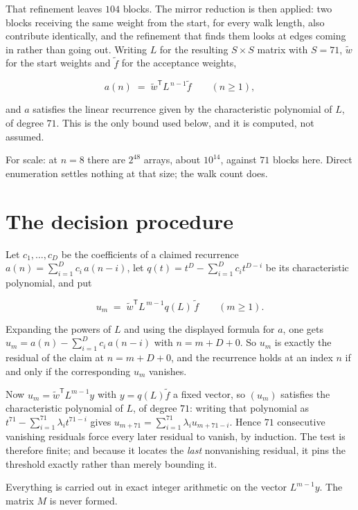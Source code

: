 \documentclass[11pt]{article}
\theoremstyle{definition}
\begin{document}
That refinement leaves $104$ blocks. The mirror reduction is then applied: two blocks receiving the same weight from the start, for every walk length, also contribute identically, and the refinement that finds them looks at edges coming in rather than going out. Writing $L$ for the resulting $S \times S$ matrix with $S = 71$, $\tilde w$ for the start weights and $\tilde f$ for the acceptance weights,

\[a(n) \;=\; \tilde w^{\mathsf T} L^{\,n-1} \tilde f \qquad (n \ge 1),\]

and $a$ satisfies the linear recurrence given by the characteristic polynomial of $L$, of degree $71$. This is the only bound used below, and it is computed, not assumed.

For scale: at $n = 8$ there are $2^{48}$ arrays, about $10^{14}$, against $71$ blocks here. Direct enumeration settles nothing at that size; the walk count does.

\section{The decision procedure}

Let $c_1,\dots,c_D$ be the coefficients of a claimed recurrence $a(n) = \sum_{i=1}^{D} c_i\,a(n-i)$, let $q(t) = t^{D} - \sum_{i=1}^{D} c_i t^{D-i}$ be its characteristic polynomial, and put

\[u_m \;=\; \tilde w^{\mathsf T} L^{\,m-1} q(L)\,\tilde f \qquad (m \ge 1).\]

Expanding the powers of $L$ and using the displayed formula for $a$, one gets $u_m = a(n) - \sum_{i=1}^{D} c_i\,a(n-i)$ with $n = m + D + 0$. So $u_m$ is exactly the residual of the claim at $n = m + D + 0$, and the recurrence holds at an index $n$ if and only if the corresponding $u_m$ vanishes.

Now $u_m = \tilde w^{\mathsf T} L^{m-1} y$ with $y = q(L)\tilde f$ a fixed vector, so $(u_m)$ satisfies the characteristic polynomial of $L$, of degree $71$: writing that polynomial as $t^{71} - \sum_{i=1}^{71} \lambda_i t^{71-i}$ gives $u_{m+71} = \sum_{i=1}^{71} \lambda_i u_{m+71-i}$. Hence $71$ consecutive vanishing residuals force every later residual to vanish, by induction. The test is therefore finite; and because it locates the {\itshape last} nonvanishing residual, it pins the threshold exactly rather than merely bounding it.

Everything is carried out in exact integer arithmetic on the vector $L^{m-1}y$. The matrix $M$ is never formed.
\end{document}
